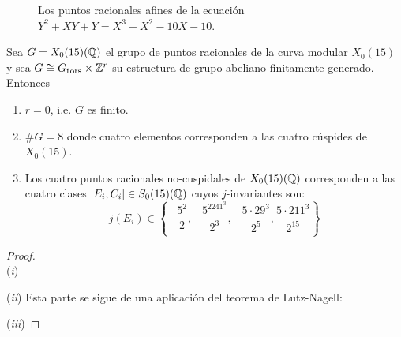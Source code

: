 \documentclass[../../tesis_maestria]{subfiles}
\begin{document}
\begin{figure}[!h]
  \caption{Los puntos racionales afines de la ecuación $Y^2+XY+Y=X^3+X^2-10X-10$.}
  \label{fig:eq_weierstrass}
\end{figure}%

\begin{prop}\label{prop:propiedadesx015}
  Sea $G=X_0(15)(\mathbb{Q})$ el grupo de puntos racionales de la curva modular $X_0(15)$ y sea $G\cong G_{\mathrm{tors}}\times\mathbb{Z}^r$ su estructura de grupo abeliano finitamente generado. Entonces
  \begin{enumerate}[label=(\roman*)]
  \item $r=0$, i.e. $G$ es finito.
  \item $\# G=8$ donde cuatro elementos corresponden a las cuatro cúspides de $X_0(15)$.
  \item Los cuatro puntos racionales no-cuspidales de $X_0(15)(\mathbb{Q})$ corresponden a las cuatro clases $[E_i,C_i]\in S_0(15)(\mathbb{Q})$ cuyos $j$-invariantes son:
    \[
      j(E_i)\in\left\{
        -\frac{5^2}{2},-\frac{5^2241^3}{2^3},-\frac{5\cdot 29^3}{2^5},\frac{5\cdot 211^3}{2^{15}}
      \right\}
    \]
  \end{enumerate}
\end{prop}

\begin{proof}$\;$\\
(\emph{i})

(\emph{ii}) Esta parte se sigue de una aplicación del teorema de Lutz-Nagell:

(\emph{iii})
\end{proof}
\end{document}
